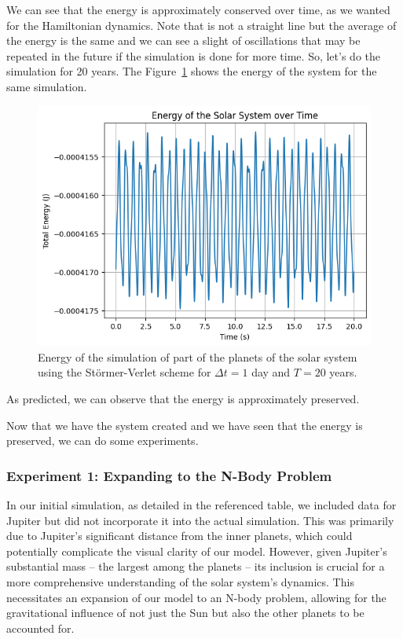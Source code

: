 \documentclass{report}
\begin{document}
We can see that the energy is approximately conserved over time, as we wanted for the Hamiltonian dynamics. Note that is not a straight line but the average of the energy is the same and we can see a slight of oscillations that may be repeated in the future if the simulation is done for more time. So, let's do the simulation for 20 years. The Figure~\ref{fig:solarsystemenergy2} shows the energy of the system for the same simulation.

\begin{figure}[H]
	\centering
	\includegraphics[width=0.5\linewidth]{./Figures/SolarSystem/energy2.png}
	\caption{Energy of the simulation of part of the planets of the solar system using the Störmer-Verlet scheme for \(\Delta t = 1\) day and \(T = 20\) years.}
	\label{fig:solarsystemenergy2}
\end{figure}

As predicted, we can observe that the energy is approximately preserved.

Now that we have the system created and we have seen that the energy is preserved, we can do some experiments. 

\subsubsection{Experiment 1: Expanding to the N-Body Problem}
\label{sec:expanding_n_body_problem}

In our initial simulation, as detailed in the referenced table, we included data for Jupiter but did not incorporate it into the actual simulation. This was primarily due to Jupiter's significant distance from the inner planets, which could potentially complicate the visual clarity of our model. However, given Jupiter's substantial mass – the largest among the planets – its inclusion is crucial for a more comprehensive understanding of the solar system's dynamics. This necessitates an expansion of our model to an N-body problem, allowing for the gravitational influence of not just the Sun but also the other planets to be accounted for.
\end{document}

